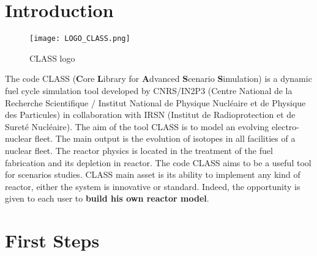 

\part{Introduction}

    \begin{figure}[H]
    \centering
    \centerline{\texttt{[image: LOGO\_CLASS.png]}}
    \caption{CLASS logo}
    \label{fig:CLASSLogo}
    \end{figure}

    \vspace{2cm}

The code CLASS (\textbf{C}ore \textbf{L}ibrary for \textbf{A}dvanced \textbf{S}cenario \textbf{S}imulation) is a dynamic fuel cycle simulation tool developed by CNRS/IN2P3 (Centre National de la Recherche Scientifique / Institut National de Physique Nucléaire et de Physique des Particules) in collaboration with IRSN (Institut de Radioprotection et de Suret\'e Nucl\'eaire). The aim of the tool CLASS is to model an evolving electro-nuclear fleet. The main output is the evolution of isotopes in all facilities of a nuclear fleet. The reactor physics is located in the treatment of the fuel fabrication and its depletion in reactor. The code CLASS aims to be a useful tool for scenarios studies. CLASS main asset is its ability to implement any kind of reactor, either the system is innovative or standard. Indeed, the opportunity is given to each user to \textbf{build his own reactor model}.

\part{First Steps}
